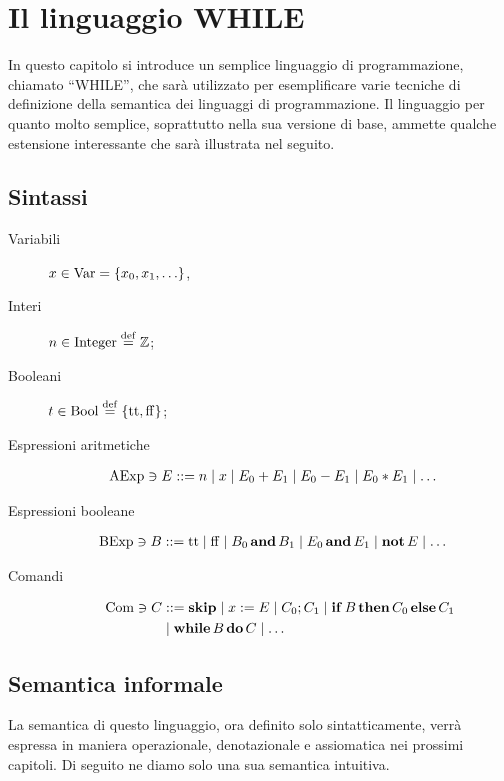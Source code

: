 \chapter{Il linguaggio WHILE}

In questo capitolo si introduce un semplice linguaggio di programmazione,
chiamato ``WHILE'',
che sarà utilizzato per esemplificare varie tecniche di definizione della
semantica dei linguaggi di programmazione.
Il linguaggio per quanto molto semplice, soprattutto nella sua versione di
base, ammette qualche estensione interessante che sarà illustrata nel
seguito.

\section{Sintassi}

\begin{description}
\item[Variabili]
$x \in \mathrm{Var} = \{ x_0, x_1, \ldots \}$,%
\item[Interi]
$n \in \Integer \defeq \Zset$;
\item[Booleani]
$t \in \Bool \defeq \{ \ttv, \ffv \}$;
\item[Espressioni aritmetiche]%
\begin{align*}
  \mathrm{AExp} \ni
  E &::= n \mathrel{\mid} x \mathrel{\mid} E_0 + E_1 \mathrel{\mid} E_0 - E_1 \mathrel{\mid} E_0 * E_1 \mathrel{\mid} \ldots
\end{align*}
\item[Espressioni booleane]%
\begin{align*}
  \mathrm{BExp} \ni
  B &::= \mathrm{tt} \mathrel{\mid} \mathrm{ff} \mathrel{\mid} B_0 \mathop{\textup{\textbf{and}}} B_1 \mathrel{\mid} E_0 \mathop{\textup{\textbf{and}}} E_1
              \mathrel{\mid} \mathop{\textup{\textbf{not}}} E \mathrel{\mid} \ldots
\end{align*}
\item[Comandi]%
\begin{align*}
  \mathrm{Com} \ni
  C &::= \mathop{\textup{\textbf{skip}}} \mathrel{\mid} x := E \mathrel{\mid} C_0 ; C_1
         \mathrel{\mid} \mathop{\textup{\textbf{if}}} B \mathop{\textup{\textbf{then}}} C_0 \mathop{\textup{\textbf{else}}} C_1 \\
    &\mathrel{\mid} \mathop{\textup{\textbf{while}}} B \mathop{\textup{\textbf{do}}} C \mathrel{\mid} \ldots
\end{align*}
\end{description}

\section{Semantica informale} 
La semantica di questo linguaggio, ora definito solo sintatticamente, verrà espressa in
maniera operazionale, denotazionale e assiomatica nei prossimi capitoli. Di seguito ne
diamo solo una sua semantica intuitiva.

